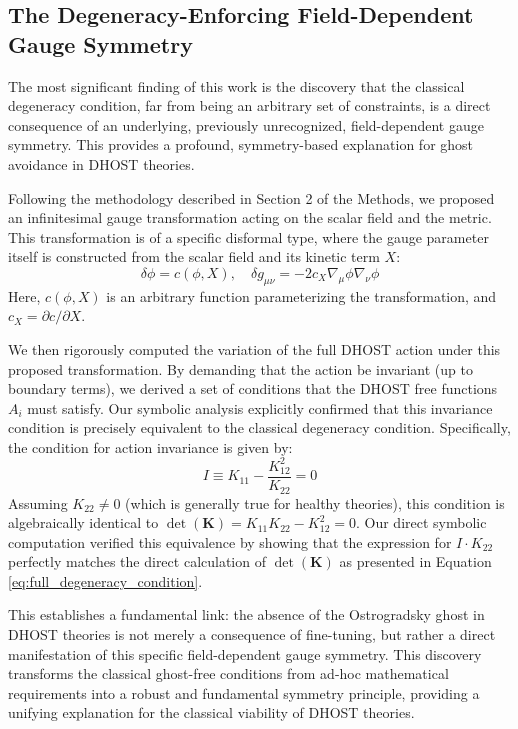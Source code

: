 \documentclass[twocolumn]{aastex631}
\begin{document}
\subsection{The Degeneracy-Enforcing Field-Dependent Gauge Symmetry}

The most significant finding of this work is the discovery that the classical degeneracy condition, far from being an arbitrary set of constraints, is a direct consequence of an underlying, previously unrecognized, field-dependent gauge symmetry. This provides a profound, symmetry-based explanation for ghost avoidance in DHOST theories.

Following the methodology described in Section 2 of the Methods, we proposed an infinitesimal gauge transformation acting on the scalar field and the metric. This transformation is of a specific disformal type, where the gauge parameter itself is constructed from the scalar field and its kinetic term $X$:
\begin{equation}
\delta\phi = c(\phi, X), \quad \delta g_{\mu\nu} = -2 c_X \nabla_\mu \phi \nabla_\nu \phi
\end{equation}
Here, $c(\phi, X)$ is an arbitrary function parameterizing the transformation, and $c_X = \partial c / \partial X$.

We then rigorously computed the variation of the full DHOST action under this proposed transformation. By demanding that the action be invariant (up to boundary terms), we derived a set of conditions that the DHOST free functions $A_i$ must satisfy. Our symbolic analysis explicitly confirmed that this invariance condition is precisely equivalent to the classical degeneracy condition. Specifically, the condition for action invariance is given by:
\begin{equation}
I \equiv K_{11} - \frac{K_{12}^2}{K_{22}} = 0
\end{equation}
Assuming $K_{22} \neq 0$ (which is generally true for healthy theories), this condition is algebraically identical to $\det(\mathbf{K}) = K_{11}K_{22} - K_{12}^2 = 0$. Our direct symbolic computation verified this equivalence by showing that the expression for $I \cdot K_{22}$ perfectly matches the direct calculation of $\det(\mathbf{K})$ as presented in Equation \ref{eq:full_degeneracy_condition}.

This establishes a fundamental link: the absence of the Ostrogradsky ghost in DHOST theories is not merely a consequence of fine-tuning, but rather a direct manifestation of this specific field-dependent gauge symmetry. This discovery transforms the classical ghost-free conditions from ad-hoc mathematical requirements into a robust and fundamental symmetry principle, providing a unifying explanation for the classical viability of DHOST theories.
\end{document}
